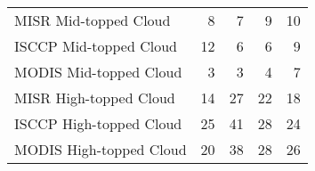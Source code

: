 \begin{tabular}{lrrrr}
   MISR Mid-topped Cloud &                        8 &                        7 &                        9 &                       10 \\
  ISCCP Mid-topped Cloud &                       12 &                        6 &                        6 &                        9 \\
  MODIS Mid-topped Cloud &                        3 &                        3 &                        4 &                        7 \\
  MISR High-topped Cloud &                       14 &                       27 &                       22 &                       18 \\
 ISCCP High-topped Cloud &                       25 &                       41 &                       28 &                       24 \\
 MODIS High-topped Cloud &                       20 &                       38 &                       28 &                       26 \\ \hline
\end{tabular}
